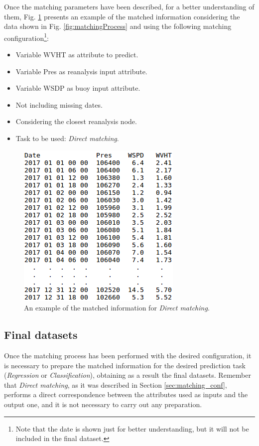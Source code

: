 \documentclass[review]{elsarticle}
\begin{document}
				Once the matching parameters have been described, for a better understanding of them,  Fig. \ref{fig:directMatching} presents an example of the matched information considering the data shown in Fig. \ref{fig:matchingProcess} and using the following matching configuration\footnote{Note that the date is shown just for better understanding, but it will not be included in the final dataset.}:
					\begin{itemize}
						\item Variable WVHT as attribute to predict.
						\item Variable Pres as reanalysis input attribute.
						\item Variable WSDP as buoy input attribute.
						\item Not including missing dates.
						\item Considering the closest reanalysis node.
						\item Task to be used: \textit{Direct matching}.
					\end{itemize}
						
				\begin{figure}[ht!]
					\centering
					\includegraphics[scale=0.49]{figures/FigureDirectMatching.png}
					\caption{An example of the matched information for \textit{Direct matching}.}
					\label{fig:directMatching}
				\end{figure}
				
				
			\subsection{Final datasets} \label{sec:FinalDatasets}

				Once the matching process has been performed with the desired configuration, it is necessary to prepare the matched information for the desired prediction task (\textit{Regression} or \textit{Classification}), obtaining as a result the final datasets. Remember that \textit{Direct matching}, as it was described in Section \ref{sec:matching_conf}, performs a direct correspondence between the attributes used as inputs and the output one, and it is not necessary to carry out any preparation.
				
\end{document}

